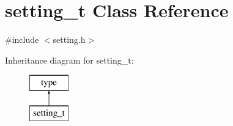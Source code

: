 \hypertarget{classsetting__t}{}\section{setting\+\_\+t Class Reference}
\label{classsetting__t}


{\ttfamily \#include $<$setting.\+h$>$}

Inheritance diagram for setting\+\_\+t\+:\begin{figure}[H]
\begin{center}
\leavevmode
\includegraphics[height=2.000000cm]{classsetting__t}
\end{center}
\end{figure}
